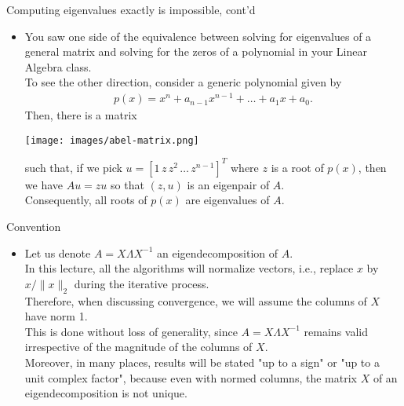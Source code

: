 \documentclass[t,usepdftitle=false]{beamer}
\begin{document}
\begin{frame}{Computing eigenvalues exactly is impossible, cont'd}
\begin{itemize}
\item[] You saw one side of the equivalence between solving for eigenvalues of a general matrix and solving for the zeros of a polynomial in your Linear Algebra class.\vspace{.1cm}\\
To see the other direction, consider a generic polynomial given by
\begin{align*}
p(x)=x^n+a_{n-1}x^{n-1}+\dots+a_1x+a_0.
\end{align*}
Then, there is a matrix 
\begin{center}
\texttt{[image: images/abel-matrix.png]}\vspace{.2cm}
\end{center}
such that, if we pick $u=[1\,z\,z^2\,\dots\,z^{n-1}]^T$ where $z$ is a root of $p(x)$, then we have $Au=zu$ so that $(z,u)$ is an eigenpair of $A$.\vspace{.1cm}\\
Consequently, all roots of $p(x)$ are eigenvalues of $A$.
\end{itemize}
\end{frame}


\begin{frame}{Convention}
\begin{itemize}
\item Let us denote $A=X\Lambda X^{-1}$ an eigendecomposition of $A$.\vspace{.1cm}\\
In this lecture, all the algorithms will normalize vectors, i.e., replace $x$ by $x/\|x\|_2$ during the iterative process.\vspace{.1cm}\\
Therefore, when discussing convergence, we will assume the columns of $X$ have norm 1.\vspace{.1cm}\\
This is done without loss of generality, since $A=X\Lambda X^{-1}$ remains valid irrespective of the magnitude of the columns of $X$.\vspace{.1cm}\\
Moreover, in many places, results will be stated "up to a sign" or "up to a unit complex factor", because even with normed columns, the matrix $X$ of an eigendecomposition is not unique.
\end{itemize}
\end{frame}
	
\end{document}
